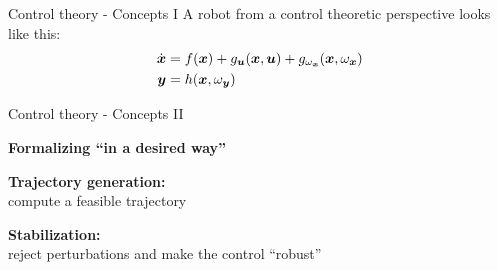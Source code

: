 \documentclass[usenames,dvipsnames,xcolor=table]{beamer}
\begin{document}
\begin{frame}{Control theory - Concepts I}
A robot from a control theoretic perspective looks like this:
\begin{align*}
     \dot{\boldsymbol{x}}  &= f( \boldsymbol{x} ) + g_{ \boldsymbol{u} }( \boldsymbol{x} ,  \boldsymbol{u} ) + g_{{\omega_{ \boldsymbol{x} }}}( \boldsymbol{x} , \omega_{ \boldsymbol{x} })  \\
     \boldsymbol{y}  &= h( \boldsymbol{x} , \omega_{ \boldsymbol{y} })
\end{align*}
\end{frame}
\begin{frame}{Control theory - Concepts II}
\begin{center}
\textbf{\Large Formalizing ``in a desired way''}\\[12pt]
\begin{minipage}{\linewidth}
\begin{minipage}[t]{0.49\linewidth}
	\begin{center}
	\textbf{\large Trajectory generation: }\\[4pt]
	compute a feasible trajectory
	\end{center}	
	\vfill
\end{minipage}
\hfill
\begin{minipage}[t]{0.49\linewidth}
	\begin{center}
	\textbf{\large Stabilization: }\\[4pt]
	reject perturbations and make the control ``robust''
	\end{center}
	\vfill
\end{minipage}
\end{minipage}
\end{center}
\end{frame}
\end{document}
